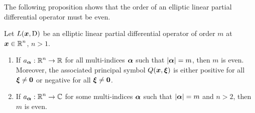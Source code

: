 The following proposition shows that the order of an elliptic linear
partial differential operator must be even.

\begin{prop} \label{classif_ell_even}
Let $L({\bm{x}}, \operatorname{D})$ be an elliptic linear partial differential
operator of order $m$ at $\displaystyle {\bm{x}} \in \mathbb{R}^n$, $n>1$.
\begin{enumerate}
\item If $\displaystyle a_{{\bm{\alpha}}}:\mathbb{R}^n \rightarrow \mathbb{R}$ for all
multi-indices ${\bm{\alpha}}$ such that $|{\bm{\alpha}}|=m$, then $m$ is even.
Moreover, the associated principal symbol $Q({\bm{x}}, {\bm{\xi}})$ is
either positive for all ${\bm{\xi}} \neq {\bm{0}}$ or negative for all
${\bm{\xi}} \neq {\bm{0}}$.
\item If $\displaystyle a_{{\bm{\alpha}}}:\mathbb{R}^n \rightarrow \mathbb{C}$ for
some multi-indices ${\bm{\alpha}}$ such that $|{\bm{\alpha}}|=m$ and
$n>2$, then $m$ is even.
\end{enumerate}
\end{prop}

